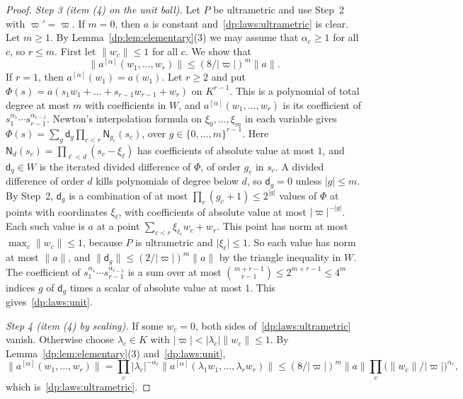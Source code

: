 \documentclass[11pt]{amsart}
\theoremstyle{definition}
\theoremstyle{remark}
\numberwithin{equation}{section}
\newcommand{\abs}[1]{\lvert #1\rvert}
\newcommand{\norm}[1]{\lVert #1\rVert}
\theoremstyle{plain}
\theoremstyle{definition}
\theoremstyle{plain}
\begin{document}
\begin{proof}
\emph{Step 3 (item (4) on the unit ball).} Let $P$ be ultrametric and use Step~2 with $\varpi'=\varpi$. If $m=0$, then $a$ is constant and~\eqref{dp:laws:ultrametric} is clear. Let $m\ge1$. By Lemma~\ref{dp:lem:elementary}(3) we may assume that $\alpha_c\ge1$ for all $c$, so $r\le m$. First let $\norm{w_c}\le1$ for all $c$. We show that
\begin{equation}\label{dp:laws:unit}
 \norm{a^{[\alpha]}(w_1,\dots,w_r)}\le(8/\abs\varpi)^m\norm a.
\end{equation}
If $r=1$, then $a^{[\alpha]}(w_1)=a(w_1)$. Let $r\ge2$ and put $\Phi(s)=a(s_1w_1+\dots+s_{r-1}w_{r-1}+w_r)$ on $K^{r-1}$. This is a polynomial of total degree at most $m$ with coefficients in $W$, and $a^{[\alpha]}(w_1,\dots,w_r)$ is its coefficient of $s_1^{\alpha_1}\cdots s_{r-1}^{\alpha_{r-1}}$. Newton's interpolation formula on $\xi_0,\dots,\xi_m$ in each variable gives $\Phi(s)=\sum_g\mathsf d_g\prod_{c<r}\mathsf N_{g_c}(s_c)$, over $g\in\{0,\dots,m\}^{r-1}$. Here $\mathsf N_d(s_c)=\prod_{\ell<d}(s_c-\xi_\ell)$ has coefficients of absolute value at most $1$, and $\mathsf d_g\in W$ is the iterated divided difference of $\Phi$, of order $g_c$ in $s_c$. A divided difference of order $d$ kills polynomials of degree below $d$, so $\mathsf d_g=0$ unless $\abs g\le m$. By Step~2, $\mathsf d_g$ is a combination of at most $\prod_c(g_c+1)\le2^{\abs g}$ values of $\Phi$ at points with coordinates $\xi_\ell$, with coefficients of absolute value at most $\abs\varpi^{-\abs g}$. Each such value is $a$ at a point $\sum_{c<r}\xi_{\ell_c}w_c+w_r$. This point has norm at most $\max_c\norm{w_c}\le1$, because $P$ is ultrametric and $\abs{\xi_\ell}\le1$. So each value has norm at most $\norm a$, and $\norm{\mathsf d_g}\le(2/\abs\varpi)^m\norm a$ by the triangle inequality in $W$. The coefficient of $s_1^{\alpha_1}\cdots s_{r-1}^{\alpha_{r-1}}$ is a sum over at most $\binom{m+r-1}{r-1}\le2^{m+r-1}\le4^m$ indices $g$ of $\mathsf d_g$ times a scalar of absolute value at most $1$. This gives~\eqref{dp:laws:unit}.

\emph{Step 4 (item (4) by scaling).} If some $w_c=0$, both sides of~\eqref{dp:laws:ultrametric} vanish. Otherwise choose $\lambda_c\in K$ with $\abs\varpi<\abs{\lambda_c}\norm{w_c}\le1$. By Lemma~\ref{dp:lem:elementary}(3) and~\eqref{dp:laws:unit},
\[
 \norm{a^{[\alpha]}(w_1,\dots,w_r)}=\prod_c\abs{\lambda_c}^{-\alpha_c}\norm{a^{[\alpha]}(\lambda_1w_1,\dots,\lambda_rw_r)}\le(8/\abs\varpi)^m\norm a\prod_c\bigl(\norm{w_c}/\abs\varpi\bigr)^{\alpha_c},
\]
which is~\eqref{dp:laws:ultrametric}.
\end{proof}
\end{document}
